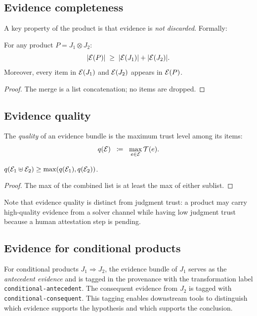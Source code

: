 \documentclass[11pt]{article}
\newcommand{\Jprod}{\mathbin{\otimes}}            %
\newcommand{\JprodN}[2]{#1 \Jprod #2}             %
\newcommand{\eqdef}{\;\coloneqq\;}                %
\begin{document}
\subsection{Evidence completeness}

A key property of the product is that evidence is \emph{not discarded}.
Formally:

\begin{proposition}\label{prop:evid-complete}
For any product $P = \JprodN{J_1}{J_2}$:
\[
  |\mathcal{E}(P)| \;\geq\; |\mathcal{E}(J_1)| + |\mathcal{E}(J_2)|.
\]
Moreover, every item in $\mathcal{E}(J_1)$ and $\mathcal{E}(J_2)$ appears in
$\mathcal{E}(P)$.
\end{proposition}
\begin{proof}
The merge is a list concatenation; no items are dropped.
\end{proof}

\subsection{Evidence quality}

The \emph{quality} of an evidence bundle is the maximum trust level
among its items:
\[
  q(\evid) \;\eqdef\; \max_{e \in \evid} \trust(e).
\]

\begin{proposition}
\label{prop:evid-quality}
$q(\mathcal{E}_1 \uplus \mathcal{E}_2) \geq \max(q(\mathcal{E}_1), q(\mathcal{E}_2))$.
\end{proposition}
\begin{proof}
The max of the combined list is at least the max of either sublist.
\end{proof}

Note that evidence quality is distinct from judgment trust: a product may
carry high-quality evidence from a solver channel while having low judgment
trust because a human attestation step is pending.

\subsection{Evidence for conditional products}

For conditional products $J_1 \Rightarrow J_2$, the evidence bundle of
$J_1$ serves as the \emph{antecedent evidence} and is tagged in the
provenance with the transformation label \texttt{conditional-antecedent}.
The consequent evidence from $J_2$ is tagged with
\texttt{conditional-consequent}.  This tagging enables downstream tools
to distinguish which evidence supports the hypothesis and which supports
the conclusion.
\end{document}
